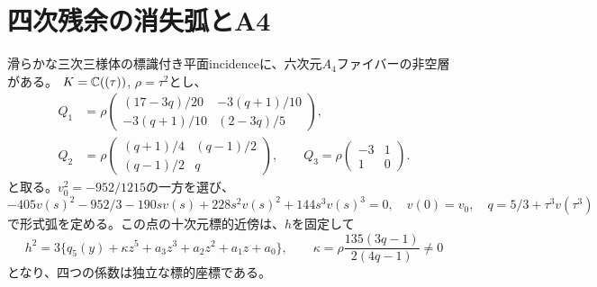 \section{四次残余の消失弧とA4}
\begin{theorem}\label{mh:a4}
滑らかな三次三様体の標識付き平面incidenceに、六次元$A_4$ファイバーの非空層がある。
$K=\mathbb C((\tau))$, $\rho=\tau^2$とし、
\begin{align*}
 Q_1&=\rho\begin{pmatrix}(17-3q)/20&-3(q+1)/10\\-3(q+1)/10&(2-3q)/5\end{pmatrix},\\
 Q_2&=\rho\begin{pmatrix}(q+1)/4&(q-1)/2\\(q-1)/2&q\end{pmatrix},\qquad
 Q_3=\rho\begin{pmatrix}-3&1\\1&0\end{pmatrix}.
\end{align*}
と取る。$v_0^2=-952/1215$の一方を選び、
\[
 -405v(s)^2-952/3-190s v(s)+228s^2v(s)^2+144s^3v(s)^3=0,
 \quad v(0)=v_0,\quad q=5/3+\tau^3v(\tau^3)
\]
で形式弧を定める。この点の十次元標的近傍は、$h$を固定して
\[
 h^2=3\{q_5(y)+\kappa z^5+a_3z^3+a_2z^2+a_1z+a_0\},\qquad
 \kappa=\rho\frac{135(3q-1)}{2(4q-1)}\ne0
\]
となり、四つの係数は独立な標的座標である。
\end{theorem}
